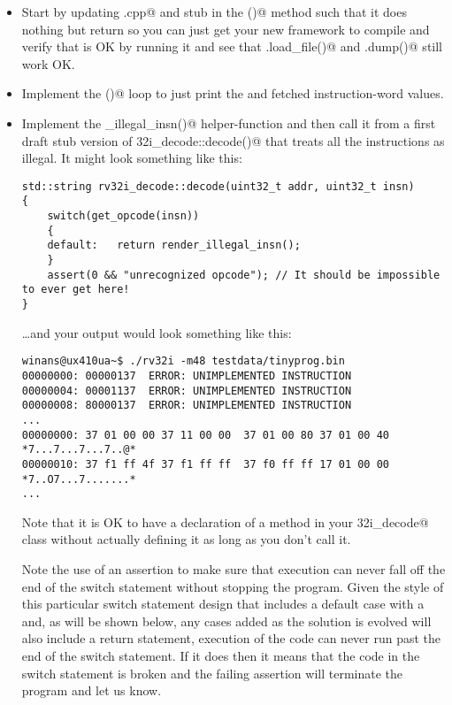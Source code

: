 \documentclass[11pt]{article}
\begin{document}
\begin{itemize}
\item
Start by updating \verb@main.cpp@ and stub in the \verb@disassemble()@
method such that it does nothing but return so you can just get your new framework to
compile and verify that is OK by running it and see that \verb@mem.load_file()@
and \verb@mem.dump()@ still work OK.

\item
Implement the \verb@disassemble()@ loop to just print the \verb@pc@ and 
fetched instruction-word values.


\item
Implement the \verb@render_illegal_insn()@ helper-function and then call it from
a first draft stub version of \verb@rv32i_decode::decode()@ that treats all the instructions 
as illegal. It might look something like this:

{\small
\begin{verbatim}
std::string rv32i_decode::decode(uint32_t addr, uint32_t insn)
{
    switch(get_opcode(insn))
    {
    default:   return render_illegal_insn();
    }
    assert(0 && "unrecognized opcode"); // It should be impossible to ever get here!
}
\end{verbatim}
}

\ldots and your output would look something like this:

{\small
\begin{verbatim}
winans@ux410ua~$ ./rv32i -m48 testdata/tinyprog.bin
00000000: 00000137  ERROR: UNIMPLEMENTED INSTRUCTION
00000004: 00001137  ERROR: UNIMPLEMENTED INSTRUCTION
00000008: 80000137  ERROR: UNIMPLEMENTED INSTRUCTION
...
00000000: 37 01 00 00 37 11 00 00  37 01 00 80 37 01 00 40 *7...7...7...7..@*
00000010: 37 f1 ff 4f 37 f1 ff ff  37 f0 ff ff 17 01 00 00 *7..O7...7.......*
...
\end{verbatim}
}
 
Note that it is OK to have a declaration of a method in your 
\verb@rv32i_decode@ class without actually defining it as long as you don't 
call it.

Note the use of an assertion to make sure that execution can never fall off the end
of the switch statement without stopping the program.  Given the style of this
particular switch statement design that includes a default case with a \verb@return@
and, as will be shown below, any cases added as the solution is evolved will
also include a return statement, execution of the code can never run past the
end of the switch statement.  If it does then it means that the code in the switch 
statement is broken and the failing assertion will terminate the program and let us know.


\end{itemize}
\end{document}
